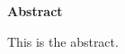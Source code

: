 \newenvironment{abstract}%
    {\cleardoublepage\thispagestyle{empty}\null\vfill\begin{center}%
    \bfseries{\textsf{Abstract}}\end{center}}%
    {\vfill\null}
        \begin{abstract}
        This is the abstract.
        \end{abstract}
